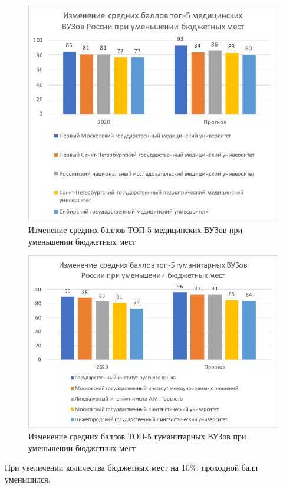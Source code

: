 \begin{figure}[hbtp]
	\centering
	\includegraphics[scale=1.0]{img/top5meddown.pdf.pdf}
	\caption{Изменение средних баллов ТОП-5 медицинских ВУЗов при уменьшении бюджетных мест}
	\label{top5meddown}
\end{figure} 

\begin{figure}[hbtp]
	\centering
	\includegraphics[scale=1.0]{img/top5gymdown.pdf.pdf}
	\caption{Изменение средних баллов ТОП-5 гуманитарных ВУЗов при уменьшении бюджетных мест}
	\label{top5gymdown}
\end{figure} 	

При увеличении количества бюджетных мест на 10\%, проходной балл уменьшился.

